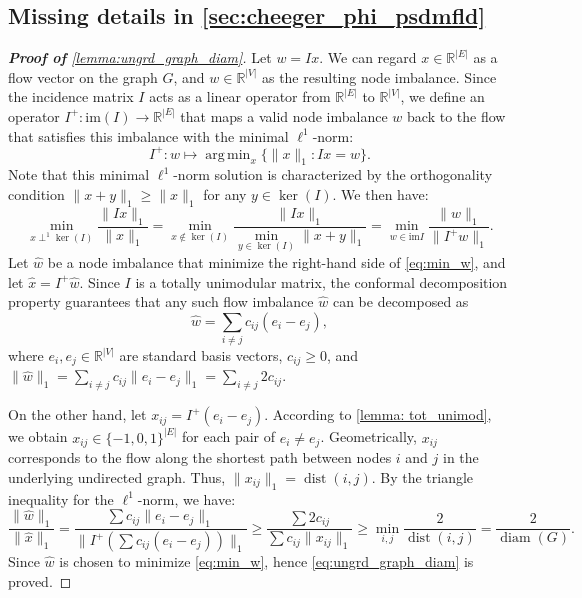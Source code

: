 \documentclass{article}
\newcommand{\im}{\mathrm{im}}
\newcommand{\dist}{\operatorname{dist}}
\newcommand{\diam}{\operatorname{diam}}
\DeclareMathOperator*{\argmin}{arg\,min}
\begin{document}
\subsection{Missing details in \cref{sec:cheeger_phi_psdmfld}}\label{sec:missing_proof}
\begin{proof}[\textbf{Proof of} \cref{lemma:ungrd_graph_diam}]
Let $w=I x$.
 We can regard $x \in \mathbb{R}^{|E|}$ as a flow vector on the graph $G$, 
 and $w \in \mathbb{R}^{|V|}$ as the resulting node imbalance.
Since the incidence matrix $I$ acts as a linear operator from $\mathbb{R}^{|E|}$ to $\mathbb{R}^{|V|}$,
we define an operator $I^{+}: \im (I)\to \mathbb{R}^{|E|}$ that maps a valid node imbalance $w$ back to the flow that satisfies this imbalance with the minimal $\ell^1$-norm:
\[I^{+}:w\mapsto \argmin_{x}\{ \|x\|_1 : Ix = w \}.\]
Note that this minimal $\ell^1$-norm solution is characterized by the orthogonality condition $\|x+y\|_1 \geq \|x\|_1$ for any $y \in \ker(I)$. 
We then have:
\begin{equation}\label{eq:min_w}
\min_{x\perp^1\ker(I)}\frac{\|Ix\|_1}{\|x\|_1}=
\min_{x\notin \ker(I)} \frac{\|I x\|_1}{\min\limits_{y\in \ker(I)}\|x+y\|_1}=
\min_{w\in \im I}\frac{\|w\|_1}{\|I^{+}w\|_1}.
\end{equation}
Let $\widehat{w}$ be a node imbalance that minimize the right-hand side of \cref{eq:min_w},
and let $\widehat{x}=I^{+}\widehat{w}$.
Since $I$ is a totally unimodular matrix,
the conformal decomposition property guarantees that any such flow imbalance $\widehat{w}$ can be decomposed as
\[
\widehat{w}=
\sum_{i\neq j} c_{ij} (e_i-e_j),
\]
where $e_i, e_j\in \mathbb{R}^{|V|}$ are standard basis vectors, $c_{ij}\geq 0$,
and $\|\widehat{w}\|_1=\sum\limits_{i\neq j} c_{ij} \|e_i - e_j\|_1=\sum\limits_{i\neq j} 2c_{ij}$.

On the other hand,
let $x_{ij}=I^{+} (e_i-e_j)$.
According to \cref{lemma: tot_unimod},
we obtain $x_{ij }\in \{-1, 0, 1\}^{|E|}$ for each pair of $e_i\neq e_j$.
Geometrically, $x_{ij}$ corresponds to the flow along the shortest path between nodes $i$ and $j$ in the underlying undirected graph.
Thus, 
$\|x_{ij}\|_1 = \dist(i, j)$.
By the triangle inequality for the $\ell^1$-norm,
we have:
\[
\frac{\|\widehat{w}\|_1}{\|\widehat{x}\|_1} = 
\frac{\sum c_{ij} \|e_i-e_j\|_1}{\| I^{+}\left(\sum c_{ij} (e_i-e_j)\right) \|_1} \geq 
\frac{\sum 2c_{ij}}{\sum c_{ij} \|x_{ij}\|_1}\geq
\min_{i, j}\frac{2}{\dist (i, j)}=\frac{2}{\diam(G)}.
\]
Since $\widehat{w}$ is chosen to minimize \cref{eq:min_w},
hence \cref{eq:ungrd_graph_diam} is proved.
\end{proof}
\end{document}
